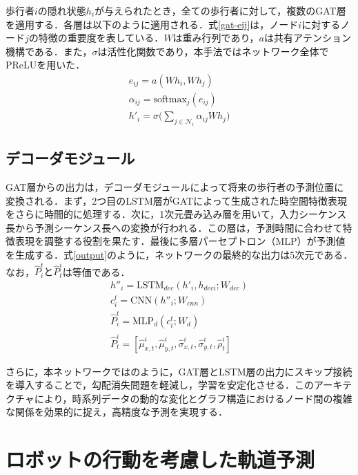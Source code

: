 歩行者$i$の隠れ状態$h_i$が与えられたとき，全ての歩行者に対して，複数のGAT層を適用する．各層は以下のように適用される．式\eqref{gat-eij}は，ノード$i$に対するノード$j$の特徴の重要度を表している．$W$は重み行列であり，$a$は共有アテンション機構である．また，$\sigma$は活性化関数であり，本手法ではネットワーク全体でPReLU\cite{he2015delving-prelu}を用いた．
\begin{align}
  e_{ij} = a(Wh_i, Wh_j) \label{gat-eij} \\
  \alpha_{ij} = \text{softmax}_{j}(e_{ij}) \\
  h'_i = \sigma\Bigg(\sum_{j \in \mathcal{N}_i} \alpha_{ij}Wh_j \Bigg)
\end{align}

\subsection{デコーダモジュール}
GAT層からの出力は，デコーダモジュールによって将来の歩行者の予測位置に変換される．まず，2つ目のLSTM層がGATによって生成された時空間特徴表現をさらに時間的に処理する．次に，1次元畳み込み層を用いて，入力シーケンス長から予測シーケンス長への変換が行われる．この層は，予測時間に合わせて特徴表現を調整する役割を果たす．最後に多層パーセプトロン（MLP）が予測値を生成する．式\eqref{output}のように，ネットワークの最終的な出力は5次元である．なお，$\hat{P}^t_i\text{と}\hat{P}^i_t$は等価である．
\begin{align}
  h''_i = \text{LSTM}_{dec}(h'_i, h_{deci}; W_{dec})\\
  c^t_i = \text{CNN}(h''_i; W_{cnn}) \\
  \hat{P}^t_i = \text{MLP}_{d}(c^t_i; W_{d}) \\
  \hat{P}^i_t = [\hat{\mu}^i_{x,t}, \hat{\mu}^i_{y, t}, \hat{\sigma}^i_{x, t}, \hat{\sigma}^i_{y, t}, \hat{\rho}^i_t] \label{output}
\end{align}

さらに，本ネットワークではのように，GAT層とLSTM層の出力にスキップ接続\cite{he2016deep-resnet}を導入することで，勾配消失問題\cite{hochreiter2001gradient-grad,weinleindiplomarbeit-grad, schmidhuber2015deep-grad}を軽減し，学習を安定化させる．このアーキテクチャにより，時系列データの動的な変化とグラフ構造におけるノード間の複雑な関係を効果的に捉え，高精度な予測を実現する．

\section{ロボットの行動を考慮した軌道予測}

